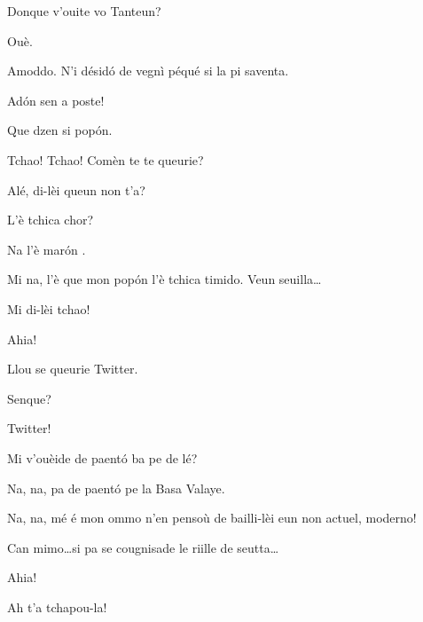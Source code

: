 \begin{drama}
\Tantaspeaks Donque v'ouite vo Tanteun?

\Tanteunspeaks Ouè.

\Tantaspeaks Amoddo. N'i désid\'o de vegnì péqué si la pi saventa.

\Tanteunspeaks Ad\'on sen a poste!


\Tantaspeaks{} Que dzen si pop\'on.


\Tantaspeaks Tchao!  Tchao! Comèn te te queurie?


\Alicespeaks{} Alé, di-lèi queun non t'a?


\Tantaspeaks L'è tchica chor?

\Tanteunspeaks Na l'è mar\'on .

\Alicespeaks Mi na, l'è que mon pop\'on l'è tchica timido.  Veun seuilla\ldots


\Tanteunspeaks{} Mi di-lèi tchao!


\Twitterspeaks Ahia!

\Alicespeaks{} Llou se queurie Twitter.

\Tantaspeaks{} Senque? 

\Alicespeaks Twitter!

\Tantaspeaks Mi v'ouèide de paent\'o ba pe de lé?

\Tanteunspeaks Na, na, pa de paent\'o pe la Basa Valaye.

\Alicespeaks Na, na, mé é mon ommo n’en pensoù de bailli-lèi eun non actuel, moderno!

\Tantaspeaks Can mimo\ldots si pa se cougnisade le riille de seutta\ldots


\Twitterspeaks{} Ahia!

\Tanteunspeaks{} Ah t'a tchapou-la!


\end{drama}
